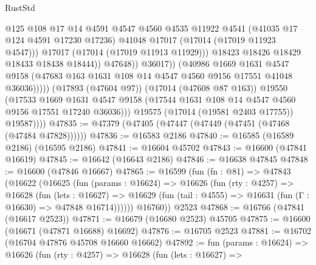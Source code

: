 \begin{lexlean}{RustStd}
\begin{coremodule}
{\begin{coremodule}
{{{{{{{{{{{{{{{{{{{{{{{{{{{{{{{{{{{{{{{{{{{{{{{{{{{{{{{                                    @125
                                    @108
                                    @17
                                    @14
                                    @4591
                                    @4547
                                    @4560
                                    @4535
                                    @11922
                                    @4541
                                    (@41035 @17 @124 @4591 @17230 @17236)
                                    @41048
                                    @17017
                                    (@17014 (@17019 @11923 @4547)))
                                  @17017
                                  (@17014 (@17019 @11913 @11929)))
                                @18423
                                @18426
                                @18429
                                @18433
                                @18438
                                @18444))
                            @47648))
                        @36017))
                    (@40986
                      @1669
                      @1631
                      @4547
                      @9158
                      (@47683 @163 @1631 @108 @14 @4547 @4560 @9156 @17551 @41048 @36036)))))
              (@17893 (@47604 @97))
              (@17014 (@47608 @87 @163))
              @19550
              (@17533
                @1669
                @1631
                @4547
                @9158
                (@17544 @1631 @108 @14 @4547 @4560 @9156 @17551 @17240 @36036)))
            @19575
            (@17014 (@19581 @2403 @17755))
            @19587))))
@47835 := @47379 (@47405 (@47447 (@47449 (@47451 (@47468 (@47484 @47828))))))
@47836 := @16583 @2186
@47840 := @16585 (@16589 @2186) (@16595 @2186)
@47841 := @16604 @45702
@47843 := @16600 (@47841 @16619)
@47845 := @16642 (@16643 @2186)
@47846 := @16638 @47845
@47848 := @16600 (@47846 @16667)
@47865 := @16599
    (fun (fn : @81) =>
    @47843
      (@16622
        (@16625
          (fun (params : @16624) =>
          @16626
            (fun (rty : @4257) =>
            @16628
              (fun (lets : @16627) =>
              @16629 (fun (tail : @4555) => @16631 (fun (Γ : @16630) => @47848 @16714))))))
        @16760))
    @2523
@47868 := @16766 (@47841 (@16617 @2523))
@47871 := @16679 (@16680 @2523) @45705
@47875 := @16600 (@16671 (@47871 @16688) @16692)
@47876 := @16705 @2523
@47881 := @16702 (@16704 @47876 @45708 @16660 @16662)
@47892 := fun (params : @16624) =>
  @16626
    (fun (rty : @4257) =>
    @16628
      (fun (lets : @16627) =>
}}}}}}}}}}}}}}}}}}}}}}}}}}}}}}}}}}}}}}}}}}}}}}}}}}}}}}}
\end{coremodule}}
\end{coremodule}
\end{lexlean}
